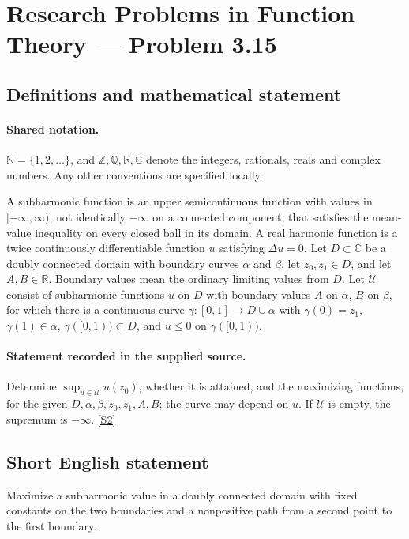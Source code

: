 \documentclass[11pt]{article}
\newcommand{\sref}[2]{\hyperlink{source:#1:#2}{[S#2]}}
\begin{document}
\section{Research Problems in Function Theory — Problem 3.15}\label{statement}

\subsection{Definitions and mathematical statement}

\paragraph{Shared notation.}$\mathbb N=\{1,2,\ldots\}$, and $\mathbb Z,\mathbb Q,\mathbb R,\mathbb C$ denote the integers, rationals, reals and complex numbers. Any other conventions are specified locally.


A subharmonic function is an upper semicontinuous function with values in $[-\infty,\infty)$, not identically $-\infty$ on a connected component, that satisfies the mean-value inequality on every closed ball in its domain. A real harmonic function is a twice continuously differentiable function $u$ satisfying $\Delta u=0$. Let $D\subset\mathbb C$ be a doubly connected domain with boundary curves $\alpha$ and $\beta$, let $z_0,z_1\in D$, and let $A,B\in\mathbb R$. Boundary values mean the ordinary limiting values from $D$. Let $\mathcal U$ consist of subharmonic functions $u$ on $D$ with boundary values $A$ on $\alpha$, $B$ on $\beta$, for which there is a continuous curve $\gamma:[0,1]\to D\cup\alpha$ with $\gamma(0)=z_1$, $\gamma(1)\in\alpha$, $\gamma([0,1))\subset D$, and $u\leq0$ on $\gamma([0,1))$.
\paragraph{Statement recorded in the supplied source.}
Determine $\sup_{u\in\mathcal U}u(z_0)$, whether it is attained, and the maximizing functions, for the given $D,\alpha,\beta,z_0,z_1,A,B$; the curve may depend on $u$. If $\mathcal U$ is empty, the supremum is $-\infty$. \sref{statement}{2}
\subsection{Short English statement}
Maximize a subharmonic value in a doubly connected domain with fixed constants on the two boundaries and a nonpositive path from a second point to the first boundary.
\end{document}
